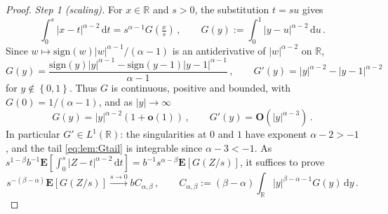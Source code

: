 \documentclass{article}
\newcommand*{\mo}[1]{\mathbf{#1}}
\newcommand{\R}{\mathbb{R}}
\newcommand{\lcb}{\left\lbrace} %
\newcommand{\rcb}{\right\rbrace} %
\newcommand{\cb}[1]{\lcb #1 \rcb} %
\newcommand{\lab}{\left[} %
\newcommand{\rab}{\right]} %
\newcommand{\ab}[1]{\lab #1 \rab} %
\newcommand{\abOf}[1]{\!\ab{#1}} %
\newcommand{\lb}{\left(} %
\newcommand{\rb}{\right)} %
\newcommand{\br}[1]{\lb #1 \rb} %
\newcommand{\brOf}[1]{\!\br{#1}} %
\newcommand{\E}{\mathbf{E}} %
\newcommand{\EOf}[1]{\E\abOf{#1}}
\newcommand{\eqcm}{\,,} %
\newcommand{\eqfs}{\,.}
\newcommand{\dl}{\mathrm{d}} %
\newcommand{\sign}{\mathrm{sign}}
\begin{document}
\begin{proof}
    \emph{Step 1 (scaling).}
    For $x\in\R$ and $s>0$, the substitution $t=su$ gives
    \begin{equation}\label{eq:lem:homog}
        \int_0^s|x-t|^{\alpha-2}\,\dl t
        =
        s^{\alpha-1}G\brOf{\tfrac xs}
        \eqcm\qquad
        G(y):=\int_0^1|y-u|^{\alpha-2}\,\dl u
        \eqfs
    \end{equation}
    Since $w\mapsto\sign(w)|w|^{\alpha-1}/(\alpha-1)$ is an antiderivative of $|w|^{\alpha-2}$ on $\R$,
    \begin{equation}
        G(y)=\frac{\sign(y)|y|^{\alpha-1}-\sign(y-1)|y-1|^{\alpha-1}}{\alpha-1}
        \eqcm\qquad
        G'(y)=|y|^{\alpha-2}-|y-1|^{\alpha-2}
    \end{equation}
    for $y\notin\cb{0,1}$. Thus $G$ is continuous, positive and bounded, with $G(0)=1/(\alpha-1)$, and as $|y|\to\infty$
    \begin{equation}\label{eq:lem:Gtail}
        G(y)=|y|^{\alpha-2}\brOf{1+\mo o(1)}
        \eqcm\qquad
        G'(y)=\mo O\brOf{|y|^{\alpha-3}}
        \eqfs
    \end{equation}
    In particular $G'\in L^1(\R)$: the singularities at $0$ and $1$ have exponent $\alpha-2>-1$, and the tail \eqref{eq:lem:Gtail} is integrable since $\alpha-3<-1$. As
    $s^{1-\beta}b^{-1}\EOf{\int_0^s|Z-t|^{\alpha-2}\,\dl t}=b^{-1}s^{\alpha-\beta}\EOf{G(Z/s)}$, it suffices to prove
    \begin{equation}\label{eq:lem:goal}
        s^{-(\beta-\alpha)}\EOf{G(Z/s)}
        \xrightarrow{s\to0}
        bC_{\alpha,\beta}
        \eqcm\qquad
        C_{\alpha,\beta}:=(\beta-\alpha)\int_\R|y|^{\beta-\alpha-1}G(y)\,\dl y
        \eqfs
    \end{equation}
    

\end{proof}
\end{document}
